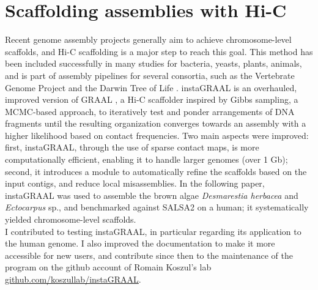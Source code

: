 
\chapter{Scaffolding assemblies with Hi-C}

Recent genome assembly projects generally aim to achieve chromosome-level scaffolds, and Hi-C scaffolding is a major step to reach this goal. This method has been included successfully in many studies for bacteria, yeasts, plants, animals, and is part of assembly pipelines for several consortia, such as the Vertebrate Genome Project \cite{vgp} and the Darwin Tree of Life \cite{dtol}. instaGRAAL is an overhauled, improved version of GRAAL \cite{graal}, a Hi-C scaffolder inspired by Gibbs sampling, a MCMC-based approach, to iteratively test and ponder arrangements of DNA fragments until the resulting organization converges towards an assembly with a higher likelihood based on contact frequencies. Two main aspects were improved: first, instaGRAAL, through the use of sparse contact maps, is more computationally efficient, enabling it to handle larger genomes (over 1 Gb); second, it introduces a module to automatically refine the scaffolds based on the input contigs, and reduce local misassemblies. In the following paper, instaGRAAL was used to assemble the brown algae \textit{Desmarestia herbacea} and \textit{Ectocarpus} sp., and benchmarked against SALSA2 \cite{salsa2} on a human; it systematically yielded chromosome-level scaffolds. \\
I contributed to testing instaGRAAL, in particular regarding its application to the human genome. I also improved the documentation to make it more accessible for new users, and contribute since then to the maintenance of the program on the github account of Romain Koszul's lab  \href{https://github.com/koszullab/instaGRAAL}{github.com/koszullab/instaGRAAL}. \\



